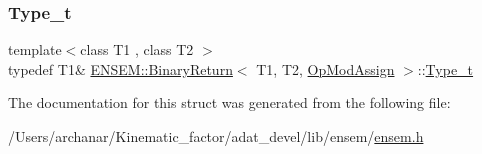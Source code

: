 \mbox{\label{structENSEM_1_1BinaryReturn_3_01T1_00_01T2_00_01OpModAssign_01_4_ac06ca0711867d98edff9da57e7a2fcb3}} 
\subsubsection{\texorpdfstring{Type\_t}{Type\_t}\hspace{0.1cm}{\footnotesize\ttfamily [2/2]}}
{\footnotesize\ttfamily template$<$class T1 , class T2 $>$ \\
typedef T1\& \mbox{\hyperlink{structENSEM_1_1BinaryReturn}{E\+N\+S\+E\+M\+::\+Binary\+Return}}$<$ T1, T2, \mbox{\hyperlink{structENSEM_1_1OpModAssign}{Op\+Mod\+Assign}} $>$\+::\mbox{\hyperlink{structENSEM_1_1BinaryReturn_3_01T1_00_01T2_00_01OpModAssign_01_4_ac06ca0711867d98edff9da57e7a2fcb3}{Type\+\_\+t}}}



The documentation for this struct was generated from the following file\+:\begin{DoxyCompactItemize}
\item 
/\+Users/archanar/\+Kinematic\+\_\+factor/adat\+\_\+devel/lib/ensem/\mbox{\hyperlink{lib_2ensem_2ensem_8h}{ensem.\+h}}\end{DoxyCompactItemize}
